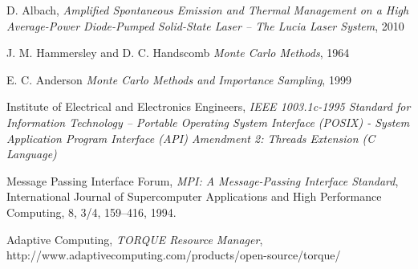 \begin{thebibliography}{9}


    D. Albach,
    \emph{Amplified Spontaneous Emission and Thermal Management on a High Average-Power Diode-Pumped Solid-State Laser \--- The Lucia Laser System},
    2010

    J. M. Hammersley and D. C. Handscomb
    \emph{Monte Carlo Methods},
    1964

    E. C. Anderson
    \emph{Monte Carlo Methods and Importance Sampling},
    1999


    Institute of Electrical and Electronics Engineers,
    \emph{IEEE 1003.1c-1995 Standard for Information Technology \---
    Portable Operating System Interface (POSIX) \-- System Application Program Interface (API) Amendment 2: Threads Extension (C Language)}

    Message Passing Interface Forum,
    \emph{MPI: A Message-Passing Interface Standard}, 
    International Journal of Supercomputer Applications and High Performance Computing,
    8, 3/4, 159–416, 1994.

    Adaptive Computing,
    \emph{TORQUE Resource Manager},
    http://www.adaptivecomputing.com/products/open-source/torque/



\end{thebibliography}
